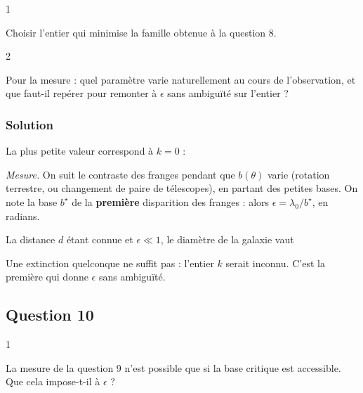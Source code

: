 \documentclass[11pt,a4paper]{article}
\newcommand{\equationajustee}[1]{%
  \sbox{\boiteequation}{$\displaystyle #1$}%
  \ifdim\wd\boiteequation>\linewidth
    \[\resizebox{\linewidth}{!}{\usebox{\boiteequation}}\]%
  \else
    \[#1\]%
  \fi}
\begin{document}
\begin{indication}{1}

Choisir l'entier qui minimise la famille obtenue à la question 8.

\end{indication}

\begin{indication}{2}

Pour la mesure : quel paramètre varie naturellement au cours de l'observation, et que faut-il repérer pour remonter à \(\epsilon\) sans ambiguïté sur l'entier ?

\end{indication}

\hypertarget{solution-8}{%
\subsubsection{Solution}\label{solution-8}}

La plus petite valeur correspond à \(k=0\) :

\equationajustee{\boxed{b_{\min}=\frac{\lambda_0}{\epsilon}}}

\emph{Mesure.} On suit le contraste des franges pendant que \(b(\theta)\) varie (rotation terrestre, ou changement de paire de télescopes), en partant des petites bases. On note la base \(b^\star\) de la \textbf{première} disparition des franges : alors \(\epsilon=\lambda_0/b^\star\), en radians.

La distance \(d\) étant connue et \(\epsilon\ll1\), le diamètre de la galaxie vaut

\equationajustee{\boxed{L=\epsilon d=\frac{\lambda_0d}{b^\star}}}

\begin{piege}

Une extinction quelconque ne suffit pas : l'entier \(k\) serait inconnu. C'est la première qui donne \(\epsilon\) sans ambiguïté.

\end{piege}

\hypertarget{question-10}{%
\subsection{Question 10}\label{question-10}}

\begin{indication}{1}

La mesure de la question 9 n'est possible que si la base critique est accessible. Que cela impose-t-il à \(\epsilon\) ?

\end{indication}
\end{document}
